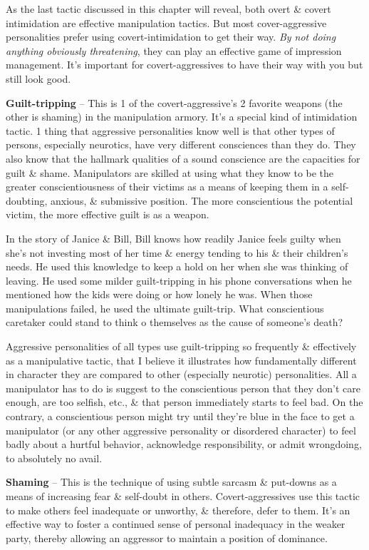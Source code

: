 \documentclass{article}
\numberwithin{equation}{section}
\begin{document}
As the last tactic discussed in this chapter will reveal, both overt \& covert intimidation are effective manipulation tactics. But most cover-aggressive personalities prefer using covert-intimidation to get their way. \textit{By not doing anything obviously threatening}, they can play an effective game of impression management. It's important for covert-aggressives to have their way with you but still look good.

\textbf{Guilt-tripping} -- This is 1 of the covert-aggressive's 2 favorite weapons (the other is shaming) in the manipulation armory. It's a special kind of intimidation tactic. 1 thing that aggressive personalities know well is that other types of persons, especially neurotics, have very different consciences than they do. They also know that the hallmark qualities of a sound conscience are the capacities for guilt \& shame. Manipulators are skilled at using what they know to be the greater conscientiousness of their victims as a means of keeping them in a self-doubting, anxious, \& submissive position. The more conscientious the potential victim, the more effective guilt is as a weapon.

In the story of Janice \& Bill, Bill knows how readily Janice feels guilty when she's not investing most of her time \& energy tending to his \& their children's needs. He used this knowledge to keep a hold on her when she was thinking of leaving. He used some milder guilt-tripping in his phone conversations when he mentioned how the kids were doing or how lonely he was. When those manipulations failed, he used the ultimate guilt-trip. What conscientious caretaker could stand to think o themselves as the cause of someone's death?

Aggressive personalities of all types use guilt-tripping so frequently \& effectively as a manipulative tactic, that I believe it illustrates how fundamentally different in character they are compared to other (especially neurotic) personalities. All a manipulator has to do is suggest to the conscientious person that they don't care enough, are too selfish, etc., \& that person immediately starts to feel bad. On the contrary, a conscientious person might try until they're blue in the face to get a manipulator (or any other aggressive personality or disordered character) to feel badly about a hurtful behavior, acknowledge responsibility, or admit wrongdoing, to absolutely no avail.

\textbf{Shaming} -- This is the technique of using subtle sarcasm \& put-downs as a means of increasing fear \& self-doubt in others. Covert-aggressives use this tactic to make others feel inadequate or unworthy, \& therefore, defer to them. It's an effective way to foster a continued sense of personal inadequacy in the weaker party, thereby allowing an aggressor to maintain a position of dominance.
\end{document}

